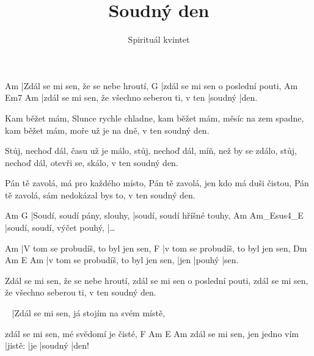 \documentclass{song}
\title{Soudný den}
\author{Spirituál kvintet}
\begin{document}
\strophe
Am
|Zdál se mi sen, že se nebe hroutí,
G
|zdál se mi sen o poslední pouti,
Am                                            Em7     Am
|zdál se mi sen, že všechno seberou ti, v ten |soudný |den.
\endstrophe

\strophe*
Kam běžet mám, Slunce rychle chladne,
kam běžet mám, měsíc na zem spadne,
kam běžet mám, moře už je na dně, v ten soudný den.
\endstrophe

\strophe*
Stůj, nechoď dál, času už je málo,
stůj, nechoď dál, míň, než by se zdálo,
stůj, nechoď dál, otevři se, skálo, v ten soudný den.
\endstrophe

\strophe*
Pán tě zavolá, má pro každého místo,
Pán tě zavolá, jen kdo má duši čistou,
Pán tě zavolá, sám nedokázal bys to, v ten soudný den.
\endstrophe

\strophe
Am                          G
|Soudí, soudí pány, slouhy, |soudí, soudí hříšné touhy,
Am                          Am_Esus4_E
|soudí, soudí, výčet pouhý, |\ldots
\endstrophe

\strophe
Am
|V tom se probudíš, to byl jen sen,
F
|v tom se probudíš, to byl jen sen,
Dm                                  Am   E      Am
|v tom se probudíš, to byl jen sen, |jen |pouhý |sen.
\endstrophe

\strophe*
Zdál se mi sen, že se nebe hroutí,
zdál se mi sen o poslední pouti,
zdál se mi sen, že všechno seberou ti, v ten soudný den.
\endstrophe

\strophe
~
|Zdál se mi sen, já stojím na svém místě,

zdál se mi sen, mé svědomí je čisté,
                              F       Am  E       Am
zdál se mi sen, jen jedno vím |jistě: |je |soudný |den!
\endstrophe
\end{document}
